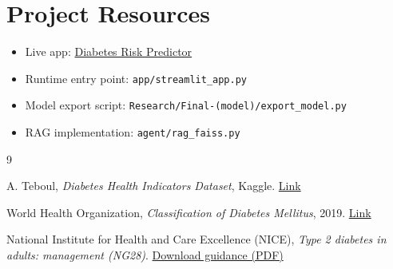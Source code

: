 \documentclass[12pt]{article}
\begin{document}
\section{Project Resources}

\begin{itemize}
\item Live app: \href{https://diabetespreidictor.streamlit.app/}{Diabetes Risk Predictor}
\item Runtime entry point: \texttt{app/streamlit\_app.py}
\item Model export script: \texttt{Research/Final-(model)/export\_model.py}
\item RAG implementation: \texttt{agent/rag\_faiss.py}
\end{itemize}

\begin{thebibliography}{9}

A. Teboul,
\textit{Diabetes Health Indicators Dataset}, Kaggle.
\href{https://www.kaggle.com/datasets/alexteboul/diabetes-health-indicators-dataset}{Link}

World Health Organization,
\textit{Classification of Diabetes Mellitus}, 2019.
\href{https://apps.who.int/iris/bitstream/handle/10665/325182/9789241515702-eng.pdf}{Link}

National Institute for Health and Care Excellence (NICE),
\textit{Type 2 diabetes in adults: management (NG28)}.
\href{https://www.nice.org.uk/guidance/ng28/resources/type-2-diabetes-in-adults-management-pdf-1837338615493}{Download guidance (PDF)}

\end{thebibliography}
\end{document}

